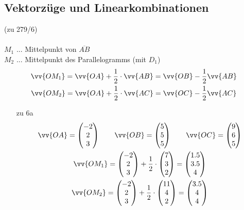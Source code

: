 \subsection{Vektorzüge und Linearkombinationen}
(zu 279/6) \\\\
$M_1$ ... Mittelpunkt von $\overline{AB}$ \\
$M_2$ ... Mittelpunkt des Parallelogramms (mit $D_1$)
\begin{gather*}
  \vv{OM_1} = \vv{OA} + \frac{1}{2} \cdot \vv{AB} = \vv{OB} - \frac{1}{2}\vv{AB} \\
  \vv{OM_2} = \vv{OA} + \frac{1}{2} \cdot \vv{AC} = \vv{OC} - \frac{1}{2}\vv{AC}
\end{gather*}
\begin{itemize}
  \item [zu 6a]
  \begin{gather*}
    \vv{OA} = \begin{pmatrix}-2 \\ 2 \\ 3\end{pmatrix} \qquad \vv{OB} = \begin{pmatrix}5 \\ 5 \\ 5\end{pmatrix} \qquad \vv{OC} = \begin{pmatrix}9 \\ 6 \\ 5\end{pmatrix} \\
    \vv{OM_1} = \begin{pmatrix}-2 \\ 2 \\ 3\end{pmatrix} + \frac{1}{2} \cdot \begin{pmatrix}7 \\ 3 \\ 2\end{pmatrix} = \begin{pmatrix}1.5 \\ 3.5 \\ 4\end{pmatrix} \\
    \vv{OM_2} = \begin{pmatrix}-2 \\ 2 \\ 3\end{pmatrix} + \frac{1}{2} \cdot \begin{pmatrix}11 \\ 4 \\ 2\end{pmatrix} = \begin{pmatrix}3.5 \\ 4 \\ 4\end{pmatrix}

\end{gather*}
\end{itemize}
